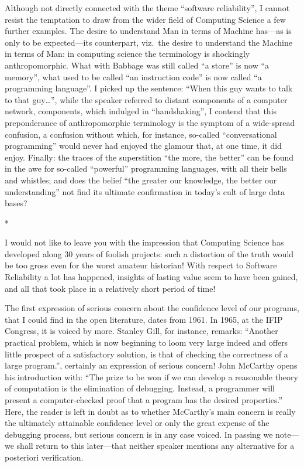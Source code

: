 \documentclass[10pt,letterpaper,twocolumn]{article}
\newcommand{\acro}[1]{{\small\MakeUppercase{#1}\spacefactor1000}}
\newcommand{\stardiv}{\medskip\centerline{*\quad*\quad*}\medskip\noindent\ignorespaces}
\begin{document}
Although not directly connected with the theme ``software reliability'', I
cannot resist the temptation to draw from the wider field of Computing Science
a few further examples. The desire to understand Man in terms of Machine
has---as is only to be expected---its counterpart, viz.~the desire to
understand the Machine in terms of Man: in computing science the terminology is
shockingly anthropomorphic. What with Babbage was still called ``a store'' is
now ``a memory'', what used to be called ``an instruction code'' is now called
``a programming language''. I picked up the sentence: ``When this guy wants to
talk to that guy\ldots'', while the speaker referred to distant components of a
computer network, components, which indulged in ``handshaking'', I contend that
this preponderance of anthropomorphic terminology is the symptom of a
wide-spread confusion, a confusion without which, for instance, so-called
``conversational programming'' would never had enjoyed the glamour that, at one
time, it did enjoy. Finally: the traces of the superstition ``the more, the
better'' can be found in the awe for so-called ``powerful'' programming
languages, with all their bells and whistles; and does the belief ``the greater
our knowledge, the better our understanding'' not find its ultimate
confirmation in today's cult of large data bases? 

\stardiv

I would not like to leave you with the impression that Computing Science has developed 
along 30 years of foolish projects: such a distortion of the truth would be too gross even for 
the worst amateur historian! With respect to Software Reliability a lot has happened, insights of 
lasting value seem to have been gained, and all 
that took place in a relatively short period of 
time! 

The first expression of serious concern about the confidence level of our
programs, that I could find in the open literature, dates from 1961. In 1965,
at the \acro{IFIP} Congress, it is voiced by more. Stanley Gill, for instance,
remarks: ``Another practical problem, which is now beginning to loom very large
indeed and offers little prospect of a satisfactory solution, is that of
checking the correctness of a large program.'', certainly an expression of
serious concern! John McCarthy opens his introduction with: ``The prize to be
won if we can develop a reasonable theory of computation is the elimination of
debugging. Instead, a programmer will present a computer-checked proof that a
program has the desired properties.'' Here, the reader is left in doubt as to
whether McCarthy's main concern is really the ultimately attainable confidence
level or only the great expense of the debugging process, but serious concern
is in any case voiced. In passing we note---we shall return to this
later---that neither speaker mentions any alternative for a posteriori
verification. 
\end{document}
